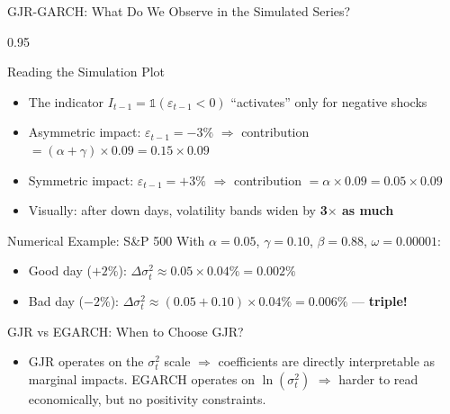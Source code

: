\documentclass[9pt, aspectratio=169, t]{beamer}
\begin{document}
\begin{frame}{GJR-GARCH: What Do We Observe in the Simulated Series?}
    \begin{cminipage}{0.95\textwidth}
    \vspace{-0.2cm}
    {\scriptsize
        \begin{block}{Reading the Simulation Plot}
            \begin{itemize}\setlength{\itemsep}{0pt}
                \item The indicator $I_{t-1} = \mathbb{1}(\varepsilon_{t-1} < 0)$ ``activates'' only for negative shocks
                \item Asymmetric impact: $\varepsilon_{t-1} = -3\%$ $\Rightarrow$ contribution $= (\alpha + \gamma) \times 0.09 = 0.15 \times 0.09$
                \item Symmetric impact: $\varepsilon_{t-1} = +3\%$ $\Rightarrow$ contribution $= \alpha \times 0.09 = 0.05 \times 0.09$
                \item Visually: after down days, volatility bands widen by \textbf{3$\times$ as much}
            \end{itemize}
        \end{block}
        \begin{exampleblock}{Numerical Example: S\&P 500}
            With $\alpha = 0.05$, $\gamma = 0.10$, $\beta = 0.88$, $\omega = 0.00001$:
            \begin{itemize}\setlength{\itemsep}{0pt}
                \item Good day ($+2\%$): $\Delta\sigma_t^2 \approx 0.05 \times 0.04\% = 0.002\%$
                \item Bad day ($-2\%$): $\Delta\sigma_t^2 \approx (0.05 + 0.10) \times 0.04\% = 0.006\%$ --- \textbf{triple!}
            \end{itemize}
        \end{exampleblock}
        \begin{alertblock}{GJR vs EGARCH: When to Choose GJR?}
            \begin{itemize}\setlength{\itemsep}{0pt}
                \item GJR operates on the $\sigma_t^2$ scale $\Rightarrow$ coefficients are directly interpretable as marginal impacts. EGARCH operates on $\ln(\sigma_t^2)$ $\Rightarrow$ harder to read economically, but no positivity constraints.
            \end{itemize}
        \end{alertblock}
    }
    \end{cminipage}
\end{frame}
\end{document}
